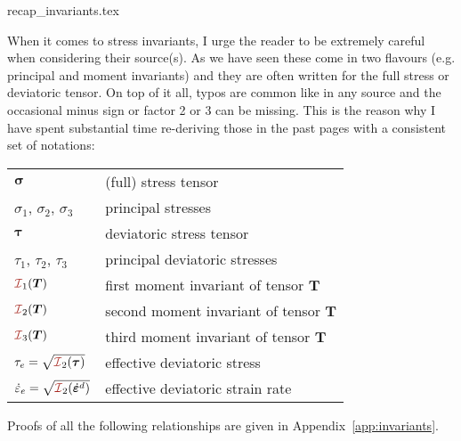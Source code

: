 \begin{flushright} {\tiny {\color{gray} recap\_invariants.tex}} \end{flushright}

When it comes to stress invariants, I urge the reader to be extremely careful when considering 
their source(s). As we have seen these come in two flavours (e.g. principal and moment invariants)
and they are often written for the full stress or deviatoric tensor. On top of it all, 
typos are common like in any source and the occasional minus sign or factor 2 or 3 can be missing.
This is the reason why I have spent substantial time re-deriving those in the past pages 
with a consistent set of notations:
\begin{center}
\begin{tabular}{ll}
\hline
${\bm \sigma}$ & (full) stress tensor \\
$\sigma_1$, $\sigma_2$, $\sigma_3$ & principal stresses \\ 
${\bm \tau}$   & deviatoric stress tensor \\
$\tau_1$, $\tau_2$, $\tau_3$ & principal deviatoric stresses \\ 
${\III}_1({\bm T})$ & first moment invariant of tensor ${\bm T}$ \\
${\III}_2({\bm T})$ & second moment invariant of tensor ${\bm T}$ \\
${\III}_3({\bm T})$ & third moment invariant of tensor ${\bm T}$ \\
${\tau}_{e}=\sqrt{{\III}_2({\bm \tau})}$ & effective deviatoric stress \\
$\dot{{\varepsilon}}_{e}=\sqrt{{\III}_2(\dot{\bm \varepsilon}^d)}$ & effective deviatoric strain rate \\
\hline
\end{tabular}
\end{center}
Proofs of all the following relationships are given in Appendix~\ref{app:invariants}.

